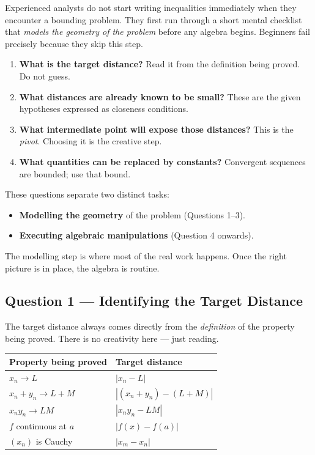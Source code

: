 Experienced analysts do not start writing inequalities immediately when
they encounter a bounding problem. They first run through a short mental
checklist that \emph{models the geometry of the problem} before any algebra
begins. Beginners fail precisely because they skip this step.

\begin{tcolorbox}[colback=gray!6, colframe=gray!40, arc=2pt,
  left=8pt, right=8pt, top=6pt, bottom=6pt,
  title={\small\textbf{The Four Questions}},
  fonttitle=\small\bfseries]
\begin{enumerate}
  \item \textbf{What is the target distance?}
        Read it from the definition being proved. Do not guess.
  \item \textbf{What distances are already known to be small?}
        These are the given hypotheses expressed as closeness conditions.
  \item \textbf{What intermediate point will expose those distances?}
        This is the \emph{pivot}. Choosing it is the creative step.
  \item \textbf{What quantities can be replaced by constants?}
        Convergent sequences are bounded; use that bound.
\end{enumerate}
\end{tcolorbox}

\medskip

These questions separate two distinct tasks:
\begin{itemize}
  \item \textbf{Modelling the geometry} of the problem (Questions 1--3).
  \item \textbf{Executing algebraic manipulations} (Question 4 onwards).
\end{itemize}
The modelling step is where most of the real work happens.
Once the right picture is in place, the algebra is routine.

\subsection{Question 1 — Identifying the Target Distance}

The target distance always comes directly from the \emph{definition}
of the property being proved. There is no creativity here — just reading.

\begin{center}
\renewcommand{\arraystretch}{1.4}
\begin{tabular}{ll}
\toprule
\textbf{Property being proved} & \textbf{Target distance} \\
\midrule
$x_n \to L$                      & $|x_n - L|$ \\
$x_n + y_n \to L + M$            & $|(x_n+y_n)-(L+M)|$ \\
$x_n y_n \to LM$                 & $|x_n y_n - LM|$ \\
$f$ continuous at $a$            & $|f(x) - f(a)|$ \\
$(x_n)$ is Cauchy                & $|x_m - x_n|$ \\
\bottomrule
\end{tabular}
\end{center}

